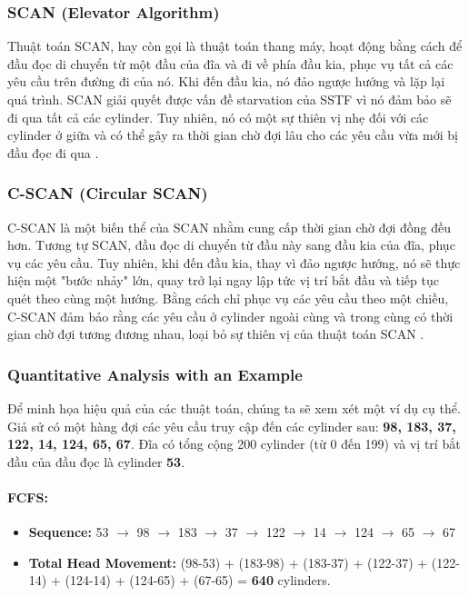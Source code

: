 \documentclass[12pt]{article}
\begin{document}
\subsubsection{SCAN (Elevator Algorithm)}
Thuật toán SCAN, hay còn gọi là thuật toán thang máy, hoạt động bằng cách để đầu đọc di chuyển từ một đầu của đĩa và đi về phía đầu kia, phục vụ tất cả các yêu cầu trên đường đi của nó. Khi đến đầu kia, nó đảo ngược hướng và lặp lại quá trình. SCAN giải quyết được vấn đề starvation của SSTF vì nó đảm bảo sẽ đi qua tất cả các cylinder. Tuy nhiên, nó có một sự thiên vị nhẹ đối với các cylinder ở giữa và có thể gây ra thời gian chờ đợi lâu cho các yêu cầu vừa mới bị đầu đọc đi qua \parencite{GeeksForGeeks2025IO}.

\subsubsection{C-SCAN (Circular SCAN)}
C-SCAN là một biến thể của SCAN nhằm cung cấp thời gian chờ đợi đồng đều hơn. Tương tự SCAN, đầu đọc di chuyển từ đầu này sang đầu kia của đĩa, phục vụ các yêu cầu. Tuy nhiên, khi đến đầu kia, thay vì đảo ngược hướng, nó sẽ thực hiện một "bước nhảy" lớn, quay trở lại ngay lập tức vị trí bắt đầu và tiếp tục quét theo cùng một hướng. Bằng cách chỉ phục vụ các yêu cầu theo một chiều, C-SCAN đảm bảo rằng các yêu cầu ở cylinder ngoài cùng và trong cùng có thời gian chờ đợi tương đương nhau, loại bỏ sự thiên vị của thuật toán SCAN \parencite{KansalDiskScheduling, GeeksForGeeks2025IO}.

\subsubsection{Quantitative Analysis with an Example}
Để minh họa hiệu quả của các thuật toán, chúng ta sẽ xem xét một ví dụ cụ thể. Giả sử có một hàng đợi các yêu cầu truy cập đến các cylinder sau: \textbf{98, 183, 37, 122, 14, 124, 65, 67}. Đĩa có tổng cộng 200 cylinder (từ 0 đến 199) và vị trí bắt đầu của đầu đọc là cylinder \textbf{53}.

\paragraph{FCFS:}
\begin{itemize}
    \item \textbf{Sequence:} 53 \(\rightarrow\) 98 \(\rightarrow\) 183 \(\rightarrow\) 37 \(\rightarrow\) 122 \(\rightarrow\) 14 \(\rightarrow\) 124 \(\rightarrow\) 65 \(\rightarrow\) 67
    \item \textbf{Total Head Movement:} (98-53) + (183-98) + (183-37) + (122-37) + (122-14) + (124-14) + (124-65) + (67-65) = \textbf{640} cylinders.
\end{itemize}
\end{document}
